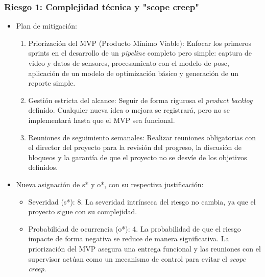 \documentclass[
11pt, %
]{charter}
\begin{document}
\subsubsection*{Riesgo 1: Complejidad técnica y "scope creep"}
\begin{itemize}
    \item Plan de mitigación:
    \begin{enumerate}
      \item Priorización del MVP (Producto Mínimo Viable): Enfocar los primeros sprints en el desarrollo de un \textit{pipeline} completo pero simple: captura de video y datos de sensores, procesamiento con el modelo de pose, aplicación de un modelo de optimización básico y generación de un reporte simple.
      \item Gestión estricta del alcance: Seguir de forma rigurosa el \textit{product backlog} definido. Cualquier nueva idea o mejora se registrará, pero no se implementará hasta que el MVP sea funcional.
      \item Reuniones de seguimiento semanales: Realizar reuniones obligatorias con el director del proyecto para la revisión del progreso, la discusión de bloqueos y la garantía de que el proyecto no se desvíe de los objetivos definidos.
    \end{enumerate}
  \item Nueva asignación de s* y o*, con su respectiva justificación:
  \begin{itemize}
  \item Severidad (s*): 8. La severidad intrínseca del riesgo no cambia, ya que el proyecto sigue con su complejidad.
  \item Probabilidad de ocurrencia (o*): 4. La probabilidad de que el riesgo impacte de forma negativa se reduce de manera significativa. La priorización del MVP asegura una entrega funcional y las reuniones con el supervisor actúan como un mecanismo de control para evitar el \textit{scope creep}.
  \end{itemize}
\end{itemize}
\end{document}
